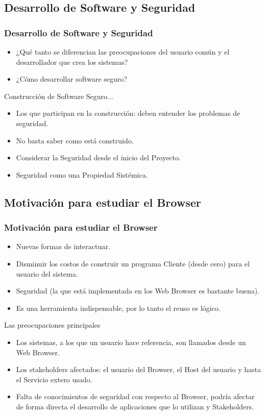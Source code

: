 \documentclass[serif,9pt]{beamer}
\begin{document}
\subsection{Desarrollo de Software y Seguridad}
\begin{frame}
\frametitle{Desarrollo de Software y Seguridad}
	\begin{itemize}
		\item ¿Qu\'e tanto se diferencian las preocupaciones del usuario com\'un y el desarrollador que crea los sistemas?
		\item ¿C\'omo desarrollar software seguro?
	\end{itemize}
	\begin{block}{Construcci\'on de Software Seguro...}
		\begin{itemize}
			\item Los que participan en la construcci\'on: deben entender los problemas de seguridad.
			\item No basta saber como est\'a construido.
			\item Considerar la Seguridad desde el inicio del Proyecto.
			\item Seguridad como una Propiedad Sist\'emica.
		\end{itemize}
	\end{block}
\end{frame}


\subsection{Motivaci\'on para estudiar el Browser}
\begin{frame}
	\frametitle{Motivaci\'on para estudiar el Browser}
	\begin{itemize}
		\item Nuevas formas de interactuar.
		\item Disminuir los costos de construir un programa Cliente (desde cero) para
el usuario del sistema.
		\item Seguridad (la que est\'a implementada en los Web Browser es bastante buena).
		\item Es una herramienta indispensable, por lo tanto el reuso es lógico.
	\end{itemize}
	
	\begin{block}{Las preocupaciones principales}
	\begin{itemize}
		\item Los sistemas, a los que un usuario hace referencia, son llamados desde un Web Browser.
		\item Los stakeholders afectados: el usuario del Browser, el Host del usuario y hasta el Servicio extero usado.
		\item Falta de conocimientos de seguridad con respecto al Browser, podr\'ia afectar de forma directa el desarrollo de aplicaciones que lo utilizan y Stakeholders.
	\end{itemize}
	\end{block}
\end{frame}
\end{document}
